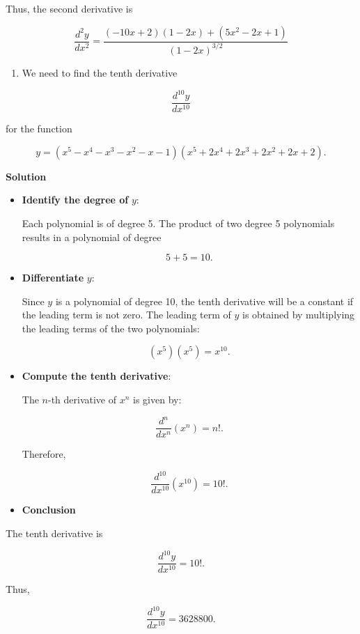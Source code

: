 \documentclass[
]{book}
\providecommand{\tightlist}{%
  \setlength{\itemsep}{0pt}\setlength{\parskip}{0pt}}
\theoremstyle{definition}
\theoremstyle{definition}
\theoremstyle{definition}
\theoremstyle{definition}
\theoremstyle{remark}
\begin{document}
Thus, the second derivative is

\[
\frac{d^2y}{dx^2} = \frac{(-10x + 2)(1 - 2x) + (5x^2 - 2x + 1)}{(1 - 2x)^{3/2}}
\]

\begin{enumerate}
\def\labelenumi{\arabic{enumi}.}
\setcounter{enumi}{9}
\tightlist
\item
  We need to find the tenth derivative
\end{enumerate}

\[
\frac{d^{10}y}{dx^{10}}
\]

for the function

\[
y = (x^5 - x^4 - x^3 - x^2 - x - 1)(x^5 + 2x^4 + 2x^3 + 2x^2 + 2x + 2).
\]

\textbf{Solution}

\begin{itemize}
\item
  \textbf{Identify the degree of} \(y\):

  Each polynomial is of degree 5. The product of two degree 5 polynomials results in a polynomial of degree

  \[
  5 + 5 = 10.
  \]
\item
  \textbf{Differentiate} \(y\):

  Since \(y\) is a polynomial of degree 10, the tenth derivative will be a constant if the leading term is not zero. The leading term of \(y\) is obtained by multiplying the leading terms of the two polynomials:

  \[
  (x^5)(x^5) = x^{10}.
  \]
\item
  \textbf{Compute the tenth derivative}:

  The \(n\)-th derivative of \(x^n\) is given by:

  \[
  \frac{d^n}{dx^n}(x^n) = n!.
  \]

  Therefore,

  \[
  \frac{d^{10}}{dx^{10}}(x^{10}) = 10!.
  \]
\item
  \textbf{Conclusion}
\end{itemize}

The tenth derivative is

\[
\frac{d^{10}y}{dx^{10}} = 10!.
\]

Thus,

\[
\frac{d^{10}y}{dx^{10}} = 3628800.
\]

  
\end{document}
